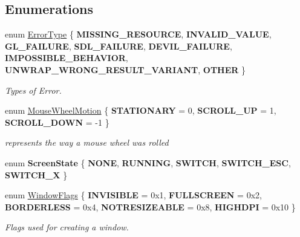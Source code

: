 \subsection*{Enumerations}
\begin{DoxyCompactItemize}
\item 
\mbox{\label{namespacenta_a1ddeff35318678e360dfa44ca9577b16}} 
enum \hyperlink{namespacenta_a1ddeff35318678e360dfa44ca9577b16}{Error\+Type} \{ \newline
{\bfseries M\+I\+S\+S\+I\+N\+G\+\_\+\+R\+E\+S\+O\+U\+R\+CE}, 
{\bfseries I\+N\+V\+A\+L\+I\+D\+\_\+\+V\+A\+L\+UE}, 
{\bfseries G\+L\+\_\+\+F\+A\+I\+L\+U\+RE}, 
{\bfseries S\+D\+L\+\_\+\+F\+A\+I\+L\+U\+RE}, 
\newline
{\bfseries D\+E\+V\+I\+L\+\_\+\+F\+A\+I\+L\+U\+RE}, 
{\bfseries I\+M\+P\+O\+S\+S\+I\+B\+L\+E\+\_\+\+B\+E\+H\+A\+V\+I\+OR}, 
{\bfseries U\+N\+W\+R\+A\+P\+\_\+\+W\+R\+O\+N\+G\+\_\+\+R\+E\+S\+U\+L\+T\+\_\+\+V\+A\+R\+I\+A\+NT}, 
{\bfseries O\+T\+H\+ER}
 \}\begin{DoxyCompactList}\small\item\em Types of Error. \end{DoxyCompactList}
\item 
\mbox{\label{namespacenta_aabafd53ba7264997db9e6e934a8ade2b}} 
enum \hyperlink{namespacenta_aabafd53ba7264997db9e6e934a8ade2b}{Mouse\+Wheel\+Motion} \{ {\bfseries S\+T\+A\+T\+I\+O\+N\+A\+RY} = 0, 
{\bfseries S\+C\+R\+O\+L\+L\+\_\+\+UP} = 1, 
{\bfseries S\+C\+R\+O\+L\+L\+\_\+\+D\+O\+WN} = -\/1
 \}\begin{DoxyCompactList}\small\item\em represents the way a mouse wheel was rolled \end{DoxyCompactList}
\item 
\mbox{\label{namespacenta_a784064b76630398da451dbeffdfc5ad2}} 
enum {\bfseries Screen\+State} \{ \newline
{\bfseries N\+O\+NE}, 
{\bfseries R\+U\+N\+N\+I\+NG}, 
{\bfseries S\+W\+I\+T\+CH}, 
{\bfseries S\+W\+I\+T\+C\+H\+\_\+\+E\+SC}, 
\newline
{\bfseries S\+W\+I\+T\+C\+H\+\_\+X}
 \}
\item 
\mbox{\label{namespacenta_a49cf148a7560d323486d7947b79a43b8}} 
enum \hyperlink{namespacenta_a49cf148a7560d323486d7947b79a43b8}{Window\+Flags} \{ \newline
{\bfseries I\+N\+V\+I\+S\+I\+B\+LE} = 0x1, 
{\bfseries F\+U\+L\+L\+S\+C\+R\+E\+EN} = 0x2, 
{\bfseries B\+O\+R\+D\+E\+R\+L\+E\+SS} = 0x4, 
{\bfseries N\+O\+T\+R\+E\+S\+I\+Z\+E\+A\+B\+LE} = 0x8, 
\newline
{\bfseries H\+I\+G\+H\+D\+PI} = 0x10
 \}\begin{DoxyCompactList}\small\item\em Flags used for creating a window. \end{DoxyCompactList}
\end{DoxyCompactItemize}

